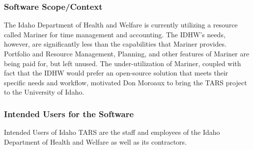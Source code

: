 \documentclass[letterpaper]{article}
\begin{document}
\subsubsection{Software Scope/Context}
The Idaho Department of Health and Welfare is currently utilizing a resource called Mariner for time management and accounting. The IDHW's needs, however, are significantly less than the capabilities that Mariner provides. Portfolio and Resource Management, Planning, and other features of Mariner are being paid for, but left unused. The under-utilization of Mariner, coupled with fact that the IDHW would prefer an open-source solution that meets their specific needs and workflow, motivated Don Moroaux to bring the TARS project to the University of Idaho. 

\subsubsection{Intended Users for the Software}
Intended Users of Idaho TARS are the staff and employees of the Idaho Department of Health and Welfare as well as its contractors.
\end{document}
